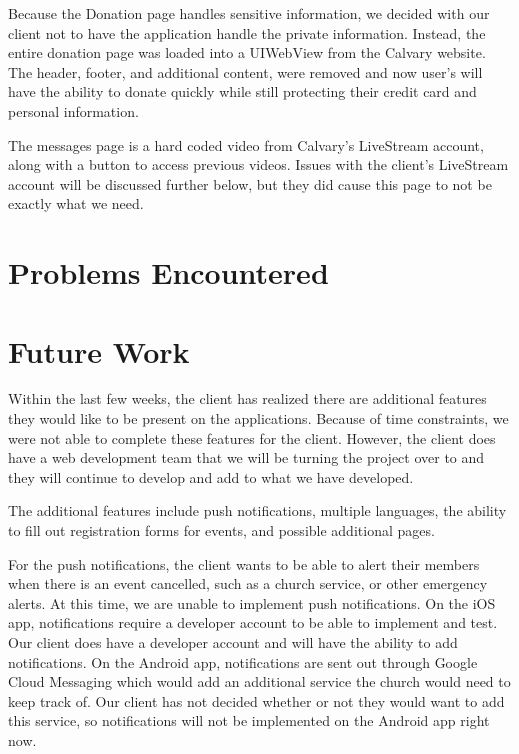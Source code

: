 \documentclass[letterpaper,10pt,draftclsnofoot,onecolumn,titlepage]{IEEEtran}
\begin{document}
		
		Because the Donation page handles sensitive information, we decided with our client not to have the application handle the private information. 
		Instead, the entire donation page was loaded into a UIWebView from the Calvary website. 
		The header, footer, and additional content, were removed and now user's will have the ability to donate quickly while still protecting their credit card and personal information. 
		
		The messages page is a hard coded video from Calvary's LiveStream account, along with a button to access previous videos. 
		Issues with the client's LiveStream account will be discussed further below, but they did cause this page to not be exactly what we need. 
		


\section{Problems Encountered}

\section{Future Work}
		Within the last few weeks, the client has realized there are additional features they would like to be present on the applications. 
		Because of time constraints, we were not able to complete these features for the client. 
		However, the client does have a web development team that we will be turning the project over to and they will continue to develop and add to what we have developed. 
		
		The additional features include push notifications, multiple languages, the ability to fill out registration forms for events, and possible additional pages. 
		
		For the push notifications, the client wants to be able to alert their members when there is an event cancelled, such as a church service, or other emergency alerts. 
		At this time, we are unable to implement push notifications. 
		On the iOS app, notifications require a developer account to be able to implement and test. 
		Our client does have a developer account and will have the ability to add notifications. 
		On the Android app, notifications are sent out through Google Cloud Messaging which would add an additional service the church would need to keep track of. 
		Our client has not decided whether or not they would want to add this service, so notifications will not be implemented on the Android app right now. 
		
\end{document}
